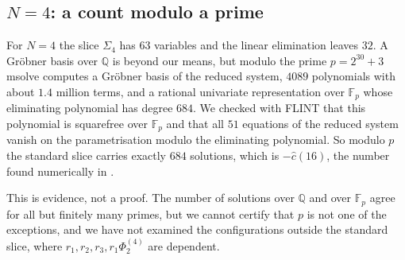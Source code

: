 \documentclass[11pt]{amsart}
\theoremstyle{definition}
\newcommand{\QQ}{\mathbb{Q}}
\begin{document}
\subsection{\texorpdfstring{$N=4$}{N=4}: a count modulo a prime}\label{ssec:N4}
For $N=4$ the slice $\Sigma_4$ has $63$ variables and the linear elimination leaves $32$. A Gröbner basis over $\QQ$ is beyond our means, but modulo the prime $p=2^{30}+3$ msolve computes a Gröbner basis of the reduced system, $4089$ polynomials with about $1.4$ million terms, and a rational univariate representation over $\mathbb F_p$ whose eliminating polynomial has degree $684$. We checked with FLINT that this polynomial is squarefree over $\mathbb F_p$ and that all $51$ equations of the reduced system vanish on the parametrisation modulo the eliminating polynomial. So modulo $p$ the standard slice carries exactly $684$ solutions, which is $-\hat c(16)$, the number found numerically in \cite{CM24}.

This is evidence, not a proof. The number of solutions over $\QQ$ and over $\mathbb F_p$ agree for all but finitely many primes, but we cannot certify that $p$ is not one of the exceptions, and we have not examined the configurations outside the standard slice, where $r_1,r_2,r_3,r_1\Phi^{(4)}_2$ are dependent.
\end{document}
